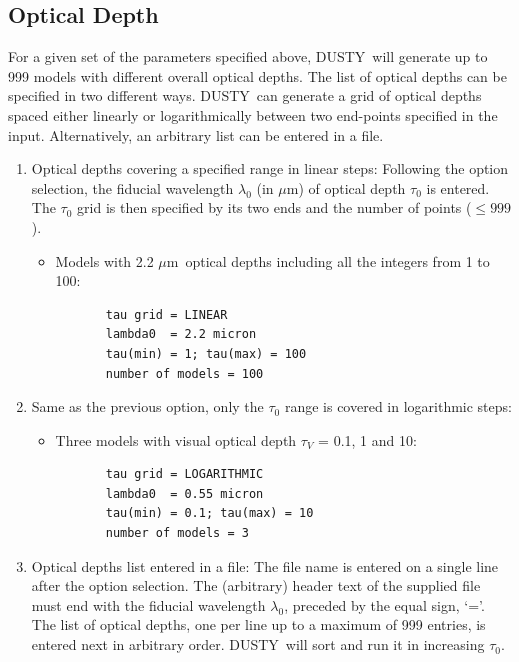 \documentclass[11pt]{article}
\def\D  {{\sf DUSTY}}
\def\mic    {\hbox{$\mu$m}}
\begin{document}
\subsection{Optical Depth}
\label{optical_depth}
For a given set of the parameters specified above, \D\ will generate up to 999
models with different overall optical depths.  The list of optical depths can
be specified in two different ways.  \D\ can generate a grid of optical depths
spaced either linearly or logarithmically between two end-points specified in
the input.  Alternatively, an arbitrary list can be entered in a file.

\begin{enumerate}

\item Optical depths covering a specified range in linear steps:  Following the
option selection, the fiducial wavelength $\lambda_0$ (in \mic) of optical
depth $\tau_0$ is entered.  The $\tau_0$ grid is then specified by its two ends
and the number of points ($\le 999$).

\begin{itemize}
\item Models with 2.2 \mic\ optical depths including all the integers from 1 to
100:

\begin{verbatim}
       tau grid = LINEAR
       lambda0  = 2.2 micron
       tau(min) = 1; tau(max) = 100
       number of models = 100
\end{verbatim}
\end{itemize}

\item Same as the previous option, only the $\tau_0$ range is covered in
logarithmic steps:

\begin{itemize}
\item Three models with visual optical depth $\tau_V$ =  0.1, 1 and 10:
\begin{verbatim}
       tau grid = LOGARITHMIC
       lambda0  = 0.55 micron
       tau(min) = 0.1; tau(max) = 10
       number of models = 3
\end{verbatim}
\end{itemize}

\item
Optical depths list entered in a file: The file name is entered on a single
line after the option selection. The (arbitrary) header text of the supplied
file must end with the fiducial wavelength $\lambda_0$, preceded by the equal
sign, `='. The list of optical depths, one per line up to a maximum of 999
entries, is entered next in arbitrary order.  \D\ will sort and run it in
increasing $\tau_0$.


\end{enumerate}
\end{document}
